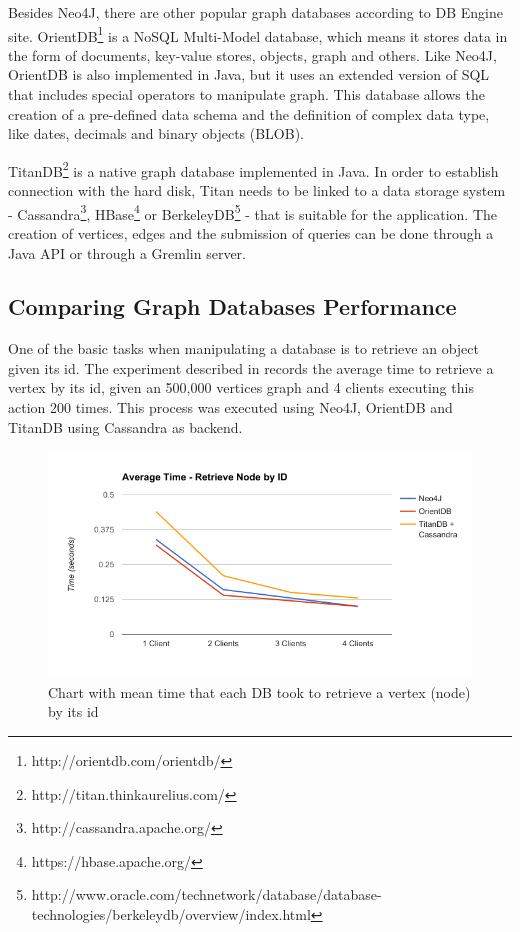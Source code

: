 Besides Neo4J, there are other popular graph databases according to DB Engine site. OrientDB\footnote{http://orientdb.com/orientdb/} is a NoSQL Multi-Model database, which means it stores data in the form of documents, key-value stores, objects, graph and others. Like Neo4J, OrientDB is also implemented in Java, but it uses an extended version of SQL that includes special operators to manipulate graph. This database allows the creation of a pre-defined data schema and the definition of complex data type, like dates, decimals and binary objects (BLOB).
 
TitanDB\footnote{http://titan.thinkaurelius.com/} is a native graph database implemented in Java. In order to establish connection with the hard disk, Titan needs to be linked to a data storage system - Cassandra\footnote{http://cassandra.apache.org/}, HBase\footnote{https://hbase.apache.org/} or BerkeleyDB\footnote{http://www.oracle.com/technetwork/database/database-technologies/berkeleydb/overview/index.html} - that is suitable for the application. The creation of vertices, edges and the submission of queries can be done through a Java API or through a Gremlin server.

\subsection{Comparing Graph Databases Performance}
One of the basic tasks when manipulating a database is to retrieve an object given its id. The experiment described in \cite{jouili2013empirical} records the average time to retrieve a vertex by its id, given an 500,000 vertices graph and 4 clients executing this action 200 times. This process was executed using Neo4J, OrientDB and TitanDB using Cassandra as backend.

\begin{figure}[!h]
\centering
\includegraphics[width=1\textwidth]{../time_test.png}
\caption{Chart with mean time that each DB took to retrieve a vertex (node) by its id \cite{jouili2013empirical}}
\label{fig:figure10}
\end{figure}

